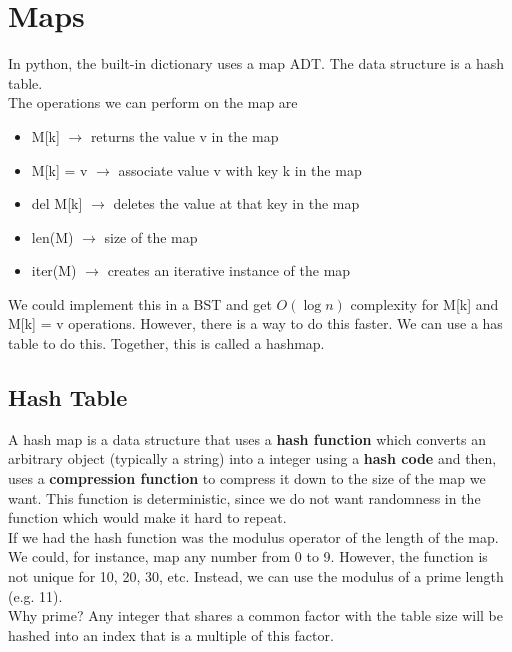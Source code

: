 \documentclass[]{article}
\begin{document}
\section{Maps}\bigbreak

In python, the built-in dictionary uses a map ADT. The data structure is a hash table.\\

The operations we can perform on the map are 

\begin{itemize}
	\item M[k] $\to$ returns the value v in the map
	\item M[k] = v $\to$ associate value v with key k in the map
	\item del M[k] $\to$ deletes the value at that key in the map
	\item len(M) $\to$ size of the map
	\item iter(M) $\to$ creates an iterative instance of the map
\end{itemize}\bigbreak

We could implement this in a BST and get $O(\log n)$ complexity for M[k] and M[k] = v operations. However, there is a way to do this faster. We can use a has table to do this. Together, this is called a hashmap.\\

\subsection{Hash Table}\bigbreak

A hash map is a data structure that uses a \textbf{hash function} which converts an arbitrary object (typically a string) into a integer using a \textbf{hash code} and then, uses a \textbf{compression function} to compress it down to the size of the map we want. This function is deterministic, since we do not want randomness in the function which would make it hard to repeat. \\


If we had the hash function was the modulus operator of the length of the map. We could, for instance, map any number from 0 to 9. However, the function is not unique for 10, 20, 30, etc. Instead, we can use the modulus of a prime length (e.g. 11).\\

Why prime? Any integer that shares a common factor with the table size will be hashed into an index that is a multiple of this factor. \\
\end{document}
